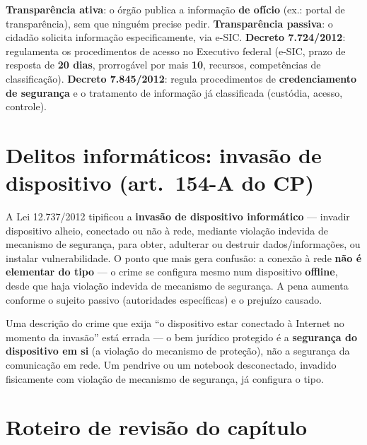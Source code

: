 \begin{conceito}
\textbf{Transparência ativa}: o órgão publica a informação \textbf{de
ofício} (ex.: portal de transparência), sem que ninguém precise pedir.
\textbf{Transparência passiva}: o cidadão solicita informação
especificamente, via e-SIC. \textbf{Decreto 7.724/2012}: regulamenta os
procedimentos de acesso no Executivo federal (e-SIC, prazo de resposta de
\textbf{20 dias}, prorrogável por mais \textbf{10}, recursos,
competências de classificação). \textbf{Decreto 7.845/2012}: regula
procedimentos de \textbf{credenciamento de segurança} e o tratamento de
informação já classificada (custódia, acesso, controle).
\end{conceito}

\section{Delitos informáticos: invasão de dispositivo (art.\ 154-A do CP)}

\begin{conceito}
A Lei 12.737/2012 tipificou a \textbf{invasão de dispositivo informático}
--- invadir dispositivo alheio, conectado ou não à rede, mediante
violação indevida de mecanismo de segurança, para obter, adulterar ou
destruir dados/informações, ou instalar vulnerabilidade. O ponto que mais
gera confusão: a conexão à rede \textbf{não é elementar do tipo} --- o
crime se configura mesmo num dispositivo \textbf{offline}, desde que haja
violação indevida de mecanismo de segurança. A pena aumenta conforme o
sujeito passivo (autoridades específicas) e o prejuízo causado.
\end{conceito}

\begin{cuidado}
Uma descrição do crime que exija “o dispositivo estar conectado à
Internet no momento da invasão” está errada --- o bem jurídico protegido é
a \textbf{segurança do dispositivo em si} (a violação do mecanismo de
proteção), não a segurança da comunicação em rede. Um pendrive ou um
notebook desconectado, invadido fisicamente com violação de mecanismo de
segurança, já configura o tipo.
\end{cuidado}

\section{Roteiro de revisão do capítulo}

